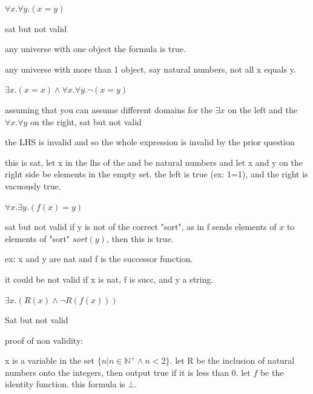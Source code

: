 \documentclass[11pt]{article}
\begin{document}
\begin{qunlist}
\begin{qparts}
  \item
    $\forall x. \forall y. (x = y)$

    \begin{answer}
      sat but not valid

      any universe with one object the formula is true.

      any universe with more than 1 object, say natural numbers, not all x equals y.

    \end{answer}

  \item
    $\exists x . (x = x) \land \forall x. \forall y. \lnot (x = y)$

    \begin{answer}
      assuming that you can assume different domains for the \(\exists x\) on the left and the \(\forall x.\forall y\) on the right,
      sat but not valid

      the LHS is invalid and so the whole expression is invalid by the prior question

      this is sat, let x in the lhs of the and be natural numbers and let x and y on the right side be elements in the empty set. the left is true (ex: 1=1), and the right is vacuously true.

    \end{answer}

  \item
    $\forall x . \exists y . (f(x) = y)$

    \begin{answer}
      sat but not valid
      if y is not of the correct "sort", as in f sends elements of \(x\) to elements of "sort" \(sort(y)\), then this is true.

      ex: x and y are nat and f is the successor function.

      it could be not valid if x is nat, f is succ, and y a string.
    \end{answer}

  \item
    $\exists x. (R(x) \land \lnot R(f(x)))$

    \begin{answer}
      Sat but not valid

      proof of non validity:

      x is a variable in the set \(\{n|n\in \mathbb N^+\land n <2\}\). let R be the inclusion of natural numbers onto the integers, then output true if it is less than 0. let \(f\) be the identity function. this formula is \(\bot\).


\end{answer}
\end{qparts}
\end{qunlist}
\end{document}
